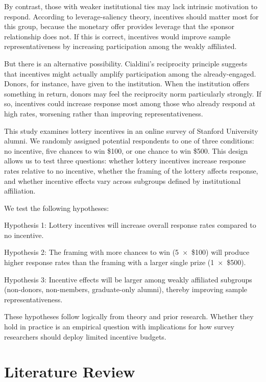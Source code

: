 By contrast, those with weaker institutional ties may lack intrinsic motivation to
respond. According to leverage-saliency theory, incentives should matter most for this
group, because the monetary offer provides leverage that the sponsor relationship does
not. If this is correct, incentives would improve sample representativeness by increasing
participation among the weakly affiliated.

But there is an alternative possibility. Cialdini's reciprocity principle suggests that
incentives might actually amplify participation among the already-engaged. Donors, for
instance, have given to the institution. When the institution offers something in return,
donors may feel the reciprocity norm particularly strongly. If so, incentives could
increase response most among those who already respond at high rates, worsening rather
than improving representativeness.

This study examines lottery incentives in an online survey of Stanford University alumni.
We randomly assigned potential respondents to one of three conditions: no incentive, five
chances to win \$100, or one chance to win \$500. This design allows us to test three
questions: whether lottery incentives increase response rates relative to no incentive,
whether the framing of the lottery affects response, and whether incentive effects vary
across subgroups defined by institutional affiliation.

We test the following hypotheses:

\bci
\item Hypothesis 1: Lottery incentives will increase overall response rates compared to
  no incentive.
\item Hypothesis 2: The framing with more chances to win (5~$\times$~\$100) will produce
  higher response rates than the framing with a larger single prize (1~$\times$~\$500).
\item Hypothesis 3: Incentive effects will be larger among weakly affiliated subgroups
  (non-donors, non-members, graduate-only alumni), thereby improving sample
  representativeness.
\eci

These hypotheses follow logically from theory and prior research. Whether they hold in
practice is an empirical question with implications for how survey researchers should
deploy limited incentive budgets.


\section{Literature Review}

